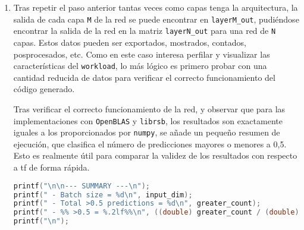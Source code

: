 \begin{enumerate}
    Si bien es cierto que en lugar de aplicar los \textit{bias} junto a la función de transferencia en la función previa, es posible realizar $C = AB + bias$, con una copia de \textit{bias} por fila, es mejor realizar esta operación en conjunción con la aplicación de la función de transferencia, ya que así se obtiene una mayor intensidad aritmética. Esta mayor intensidad aritmética es especialmente relevante cuando una función se paraleliza, ya que lo más probable es que \texttt{map\_and\_bias} sea \textit{memory-bound} en mayor o menor medida en función de la función de transferencia. Además, si se realizara operación sobre una matriz pre-inicializada con los \textit{bias} en cada fila, se necesitaría replicar los valores de \textit{bias} \texttt{input\_dim}\footnote{Se denomina \texttt{input\_dim} al número de filas de la entrada, es decir, el número de datos multidimensionales que entran a la red.} veces, replicación que no es gratuita.

    Una implementación básica de \texttt{map\_and\_bias} es similar a la siguiente:
\begin{lstlisting}[language=C]
void map_and_bias__fp32(fp32 *restrict A, const fp32 *restrict bias, const uint32_t M, const uint32_t N, fp32 (* map_function)(fp32 x)){
    for (uint32_t i = 0; i < M; i++){
        for(uint32_t j = 0; j < N; j++){
            A[i*N+j].val = map_function((fp32)(A[i*N+j].val +
                                        bias[j].val)).val;
        }
    }
}
\end{lstlisting}

    \item Tras repetir el paso anterior tantas veces como capas tenga la arquitectura, la salida de cada capa \texttt{M} de la red se puede encontrar en \texttt{layerM\_out}, pudiéndose encontrar la salida de la red en la matriz \texttt{layerN\_out} para una red de \texttt{N} capas. Estos datos pueden ser exportados, mostrados, contados, posprocesados, etc. Como en este caso interesa perfilar y visualizar las características del \texttt{workload}, lo más lógico es primero probar con una cantidad reducida de datos para verificar el correcto funcionamiento del código generado.
    
    Tras verificar el correcto funcionamiento de la red, y observar que para las implementaciones con \texttt{OpenBLAS} y \texttt{librsb}, los resultados son exactamente iguales a los proporcionados por \texttt{numpy}, se añade un pequeño resumen de ejecución, que clasifica el número de predicciones mayores o menores a 0,5. Esto es realmente útil para comparar la validez de los resultados con respecto a \acrlong{tf} de forma rápida.

\begin{lstlisting}[language=C]
printf("\n\n--- SUMMARY ---\n");
printf(" - Batch size = %d\n", input_dim);
printf(" - Total >0.5 predictions = %d\n", greater_count);
printf(" - %% >0.5 = %.2lf%%\n", ((double) greater_count / (double) input_dim)*100);
printf("\n");
\end{lstlisting}

\end{enumerate}


